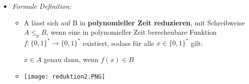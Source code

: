 \begin{itemize}
\begin{itemize}
                    \item \textit{Formale Definition:}
                        \begin{itemize}
                            \item[]
                                A lässt sich auf B in \textbf{polynomieller Zeit reduzieren}, mit Schreibweise $A \leq_p B$, wenn eine
                                in polynomieller Zeit berechenbare Funktion $f: \{0,1\}^* \rightarrow \{0,1\}^*$ existiert, sodass
                                für alle $x \in \{0,1\}^*$ gilt: \\
                                \centerline{$x \in A$ genau dann, wenn $f(x)\in B$}
                            \item[] \texttt{[image: reduktion2.PNG]}
                        \end{itemize}
                \end{itemize}

\pagebreak


\end{itemize}
